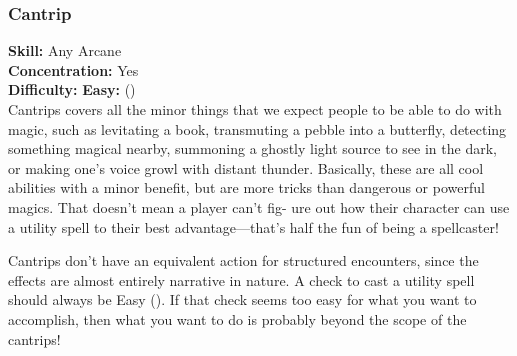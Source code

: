 \subsubsection{Cantrip}
\textbf{Skill:} Any Arcane\\
\textbf{Concentration:} Yes\\
\textbf{Difficulty:} \textbf{Easy:} (\difficulty)\\
Cantrips covers all the minor things that we expect
people to be able to do with magic, such as levitating a
book, transmuting a pebble into a butterfly, detecting
something magical nearby, summoning a ghostly light
source to see in the dark, or making one’s voice growl
with distant thunder. Basically, these are all cool abilities
with a minor benefit, but are more tricks than dangerous
or powerful magics. That doesn’t mean a player can't fig-
ure out how their character can use a utility spell to their
best advantage—that’s half the fun of being a spellcaster!

Cantrips don't have an equivalent action for
structured encounters, since the effects are almost
entirely narrative in nature. A check to cast a utility spell
should always be Easy (\difficulty). If that check seems too easy
for what you want to accomplish, then what you want to
do is probably beyond the scope of the cantrips!

